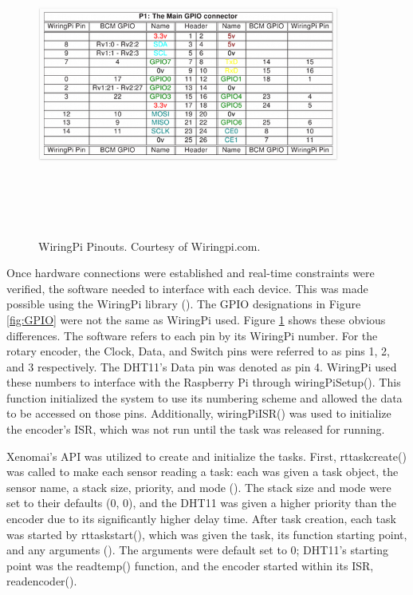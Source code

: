 \documentclass[letterpaper, 12pt]{article}
\begin{document}
\begin{figure}[H]
	\centering
	\includegraphics[width=10cm,height=10cm,keepaspectratio]{pi_pins.png}
	\caption[Pinouts]{WiringPi Pinouts. Courtesy of Wiringpi.com.}
	\label{fig:pinouts}
\end{figure}

Once hardware connections were established and real-time constraints were verified, the software needed to interface with each device.  This was made possible using the WiringPi library (\cite{gordonhenderson2018}).  The GPIO designations in Figure \ref{fig:GPIO} were not the same as WiringPi used.  Figure \ref{fig:pinouts} shows these obvious differences. The software refers to each pin by its WiringPi number.  For the rotary encoder, the Clock, Data, and Switch pins were referred to as pins 1, 2, and 3 respectively.  The DHT11's Data pin was denoted as pin 4.  WiringPi used these numbers to interface with the Raspberry Pi through wiringPiSetup().  This function initialized the system to use its numbering scheme and allowed the data to be accessed on those pins.  Additionally, wiringPiISR() was used to initialize the encoder's ISR, which was not run until the task was released for running.

Xenomai's API was utilized to create and initialize the tasks.  First, rt\textunderscore task\textunderscore create() was called to make each sensor reading a task: each was given a task object, the sensor name, a stack size, priority, and mode (\cite{xenomai2018}).  The stack size and mode were set to their defaults (0, 0), and the DHT11 was given a higher priority than the encoder due to its significantly higher delay time.  After task creation, each task was started by rt\textunderscore task\textunderscore start(), which was given the task, its function starting point, and any arguments (\cite{xenomai2018}).  The arguments were default set to 0; DHT11's starting point was the read\textunderscore temp() function, and the encoder started within its ISR, read\textunderscore encoder().
\end{document}
